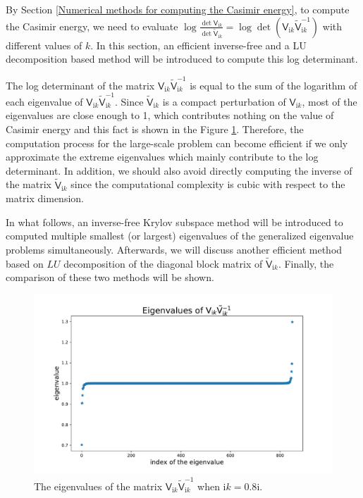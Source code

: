 By Section \ref{Numerical methods for computing the Casimir energy}, to compute the Casimir energy, we need to evaluate 
$\log\frac{\det\mathsf{V}_{\mathrm{i}k}}{\det\tilde{\mathsf{V}}_{\mathrm{i}k}} = \log\det(\mathsf{V}_{\mathrm{i}k}\tilde{\mathsf{V}}_{\mathrm{i}k}^{-1})$ 
with different values of $k$. In this section, an efficient inverse-free and a LU decomposition based method will be introduced to compute this log determinant.

The log determinant of the matrix $\mathsf{V}_{\mathrm{i}k}\tilde{\mathsf{V}}_{\mathrm{i}k}^{-1}$ is equal to the sum of the logarithm of each eigenvalue of 
$\mathsf{V}_{\mathrm{i}k}\tilde{\mathsf{V}}_{\mathrm{i}k}^{-1}$. Since $\tilde{\mathsf{V}}_{\mathrm{i}k}$ is a compact perturbation of $\mathsf{V}_{\mathrm{i}k}$,
most of the eigenvalues are close enough to 1, which contributes nothing on the value of Casimir energy and this fact is shown in the Figure \ref{eigenvalues of VVtilde}.
Therefore, the computation process for the large-scale problem can become efficient if we only approximate the extreme eigenvalues 
which mainly contribute to the log determinant. In addition, we should also avoid directly computing the inverse of the matrix $\tilde{\mathsf{V}}_{\mathrm{i}k}$
since the computational complexity is cubic with respect to the matrix dimension.

In what follows, an inverse-free Krylov subspace method will be introduced to computed multiple smallest (or largest) eigenvalues of the generalized eigenvalue
problems simultaneously. Afterwards, we will discuss another efficient method based on $LU$ decomposition of the diagonal block matrix of $\tilde{\mathsf{V}}_{\mathrm{i}k}$. 
Finally, the comparison of these two methods will be shown.
\begin{figure}[H]
    \centering
    \includegraphics[scale = 0.5]{figures/eigenvalue_of_VVtilde.pdf}
    \caption{The eigenvalues of the matrix $\mathsf{V}_{\mathrm{i}k}\tilde{\mathsf{V}}_{\mathrm{i}k}^{-1}$ when $\mathrm{i}k = 0.8\mathrm{i}$.}
    \label{eigenvalues of VVtilde}
\end{figure}
